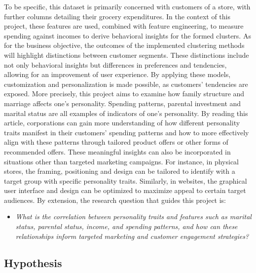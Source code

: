 \documentclass[11pt]{article}
\begin{document}
To be specific, this dataset is primarily concerned with customers of a store, with further columns detailing their grocery expenditures. In the context of this project, these features are used, combined with feature engineering, to measure spending against incomes to derive behavioral insights for the formed clusters. As for the business objective, the outcomes of the implemented clustering methods will highlight distinctions between customer segments. These distinctions include not only behavioral insights but differences in preferences and tendencies, allowing for an improvement of user experience. By applying these models, customization and personalization is made possible, as customers’ tendencies are exposed. More precisely, this project aims to examine how family structure and marriage affects one’s personality. Spending patterns, parental investment and marital status are all examples of indicators of one’s personality. By reading this article, corporations can gain more understanding of how different personality traits manifest in their customers’ spending patterns and how to more effectively align with these patterns through tailored product offers or other forms of recommended offers. These meaningful insights can also be incorporated in situations other than targeted marketing campaigns. For instance, in physical stores, the framing, positioning and design can be tailored to identify with a target group with specific personality traits. Similarly, in websites, the graphical user interface and design can be optimized to maximize appeal to certain target audiences. By extension, the research question that guides this project is:

\begin{itemize}
	\item \textit{What is the correlation between personality traits and features such as marital status, parental status, income, and spending patterns, and how can these relationships inform targeted marketing and customer engagement strategies?}

\end{itemize}
\vspace{1\baselineskip}
\subsection{Hypothesis}
\end{document}
